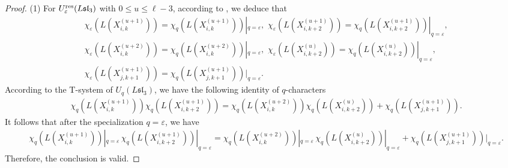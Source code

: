 \documentclass[11pt, reqno]{amsart}
\theoremstyle{plain}
\theoremstyle{definition}
\numberwithin{equation}{section}
\newcommand{\res}{{\rm res}}
\begin{document}
\begin{proof}
(1) For $U_{\varepsilon}^{\res}({L\mathfrak{sl}_{3}})$ with $0\leq u \leq \ell-3$, according to \cite[Lemma 5.6]{ALLZ25}, we deduce that
\begin{align*}
& \chi_\varepsilon(L(X^{(u+1)}_{i,k}))=\chi_q(L(X^{(u+1)}_{i,k}))|_{q=\varepsilon},\,\,
 \chi_\varepsilon(L(X^{(u+1)}_{i,k+2}))=\chi_q(L(X^{(u+1)}_{i,k+2}))|_{q=\varepsilon},\\
& \chi_\varepsilon(L(X^{(u+2)}_{i,k}))=\chi_q(L(X^{(u+2)}_{i,k}))|_{q=\varepsilon},\,\,
 \chi_\varepsilon(L(X^{(u)}_{i,k+2}))=\chi_q(L(X^{(u)}_{i,k+2}))|_{q=\varepsilon},\\
& \chi_\varepsilon(L(X^{(u+1)}_{j,k+1}))=\chi_q(L(X^{(u+1)}_{j,k+1}))|_{q=\varepsilon}.
\end{align*}
According to the T-system of $U_{q}({L\mathfrak{sl}_{3}})$, we have the following identity of $q$-characters
\begin{align*}
&\chi_q(L(X^{(u+1)}_{i,k})) \chi_q(L(X^{(u+1)}_{i,k+2}))=\chi_q(L(X^{(u+2)}_{i,k})) \chi_q(L(X^{(u)}_{i,k+2}))+\chi_q(L(X^{(u+1)}_{j,k+1})).
\end{align*}
It follows that after the specialization $q=\varepsilon$, we have 
{\small
\begin{align*}
&\chi_q(L(X^{(u+1)}_{i,k}))|_{q=\varepsilon}\, \chi_q(L(X^{(u+1)}_{i,k+2}))|_{q=\varepsilon}=\chi_q(L(X^{(u+2)}_{i,k}))| _{q=\varepsilon}\,\chi_q(L(X^{(u)}_{i,k+2}))|_{q=\varepsilon}+\chi_q(L(X^{(u+1)}_{j,k+1}))|_{q=\varepsilon}.
\end{align*}}
Therefore, the conclusion is valid.


\end{proof}
\end{document}
